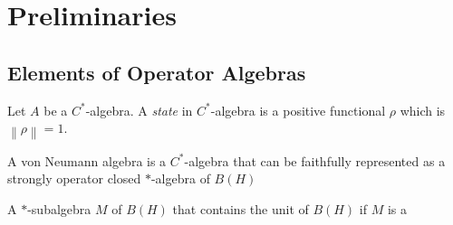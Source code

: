 \chapter{Preliminaries}



\section{Elements of Operator Algebras}

Let \(A\) be a \(C^\ast\)-algebra. A \emph{state} in \(C^\ast\)-algebra is a positive functional \(\rho\) which is \(\left \lVert \rho \right \rVert=1\).


\begin{definition}
    A von Neumann algebra is a \(C^\ast\)-algebra that can be faithfully represented as a strongly operator closed \(\ast\)-algebra of \(B(H)\)
\end{definition}

\begin{theorem}
    A \(\ast\)-subalgebra \(M\) of \(B(H)\) that contains the unit of \(B(H)\) if \(M\) is a
\end{theorem}

